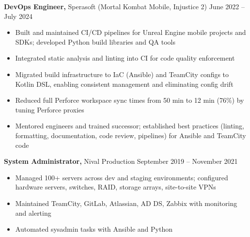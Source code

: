 \documentclass[10.5pt]{article}
\begin{document}
\textbf{DevOps Engineer,} Sperasoft (Mortal Kombat Mobile, Injustice 2) \hfill June 2022 -- July 2024 \\
\vspace{-8pt}
\begin{itemize}
  \item Built and maintained CI/CD pipelines for Unreal Engine mobile projects and SDKs; developed Python build libraries and QA tools
  \item Integrated static analysis and linting into CI for code quality enforcement
  \item Migrated build infrastructure to IaC (Ansible) and TeamCity configs to Kotlin DSL, enabling consistent management and eliminating config drift
  \item Reduced full Perforce workspace sync times from 50 min to 12 min (76\%) by tuning Perforce proxies
  \item Mentored engineers and trained successor; established best practices (linting, formatting, documentation, code review, pipelines) for Ansible and TeamCity code
\end{itemize}

\textbf{System Administrator,} Nival Production \hfill September 2019 -- November 2021 \\
\vspace{-8pt}
\begin{itemize}
  \item Managed 100+ servers across dev and staging environments; configured hardware servers, switches, RAID, storage arrays, site-to-site VPNs
  \item Maintained TeamCity, GitLab, Atlassian, AD DS, Zabbix with monitoring and alerting
  \item Automated sysadmin tasks with Ansible and Python
\end{itemize}
\end{document}
